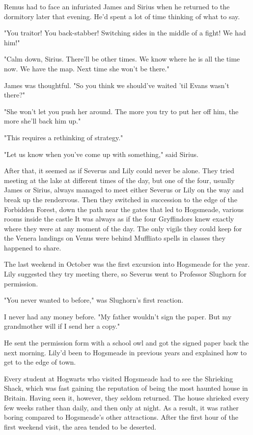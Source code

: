 Remus had to face an infuriated James and Sirius when he returned to the dormitory later that evening. He'd spent a lot of time thinking of what to say.

"You traitor! You back-stabber! Switching sides in the middle of a fight! We had him!"

"Calm down, Sirius. There'll be other times. We know where he is all the time now. We have the map. Next time she won't be there."

James was thoughtful. "So you think we should've waited 'til Evans wasn't there?"

"She won't let you push her around. The more you try to put her off him, the more she'll back him up."

"This requires a rethinking of strategy."

"Let us know when you've come up with something," said Sirius.

After that, it seemed as if Severus and Lily could never be alone. They tried meeting at the lake at different times of the day, but one of the four, usually James or Sirius, always managed to meet either Severus or Lily on the way and break up the rendezvous. Then they switched in succession to the edge of the Forbidden Forest, down the path near the gates that led to Hogsmeade, various rooms inside the castle{\el} It was always as if the four Gryffindors knew exactly where they were at any moment of the day. The only vigils they could keep for the Venera landings on Venus were behind Muffliato spells in classes they happened to share.

The last weekend in October was the first excursion into Hogsmeade for the year. Lily suggested they try meeting there, so Severus went to Professor Slughorn for permission.

"You never wanted to before," was Slughorn's first reaction.

I never had any money before. "My father wouldn't sign the paper. But my grandmother will if I send her a copy."

He sent the permission form with a school owl and got the signed paper back the next morning. Lily'd been to Hogsmeade in previous years and explained how to get to the edge of town.

Every student at Hogwarts who visited Hogsmeade had to see the Shrieking Shack, which was fast gaining the reputation of being the most haunted house in Britain. Having seen it, however, they seldom returned. The house shrieked every few weeks rather than daily, and then only at night. As a result, it was rather boring compared to Hogsmeade's other attractions. After the first hour of the first weekend visit, the area tended to be deserted.

